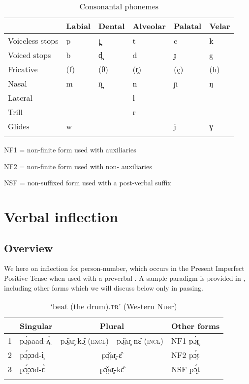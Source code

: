 \documentclass[output=paper,newtxmath,modfonts,nonflat]{langsci/langscibook}
\begin{document}
\begin{table}
\begin{tabularx}{\textwidth}{XXXXXX}
\lsptoprule
& \bfseries Labial & \bfseries Dental & \bfseries Alveolar & \bfseries Palatal & \bfseries Velar\\
\midrule 
Voiceless stops & p & t̪ & t & c & k\\
Voiced stops & b & d̪ & d & ɟ & g\\
Fricative & (f) & (θ) & (r̥) & (ç) & (h)\\
Nasal & m & n̪ & n & ɲ & ŋ\\
Lateral &  &  & l &  & \\
Trill &  &  & r &  & \\
Glides & w &  &  & j & ɣ\\
\lspbottomrule
\end{tabularx}
\caption{Consonantal phonemes}
\label{tab:monich:2}
\end{table}

\pagebreak

NF1 = non-finite form used with  auxiliaries

NF2 = non-finite form used with non- auxiliaries

NSF = non-suffixed form used with a post-verbal suffix

\section{Verbal inflection}
\subsection{Overview} %

We  here on inflection for  person-number, which occurs in the Present Imperfect Positive Tense when used with a preverbal . A sample paradigm is provided in , including other forms which we will discuss below only in passing.

\begin{table}
\begin{tabularx}{\textwidth}{llrll}
\lsptoprule
 & \bfseries Singular & \multicolumn{2}{c}{\bfseries Plural} & \bfseries Other forms\\
\midrule
1  & pɔ̤́aaad-ʌ̤̀ & \multicolumn{1}{r}{pɔ̤̌ar̥-kɔ̤̌ (\textsc{excl})} & \multicolumn{1}{l}{pɔ̤̌ar̥-nɛ̂ (\textsc{incl})} & NF1 pɔ̤̀r̥\\
2 & pɔ̤́ɔɔd-ì̤ & \multicolumn{2}{c}{pɔ̤̌ar̥-ɛ̂} & NF2 pɔ̤́t\\
3 & pɔ̤́ɔɔd-ɛ̀ & \multicolumn{2}{c}{pɔ̤̌ar̥-kɛ̂} & NSF pɔ̤́t\\
\lspbottomrule
\end{tabularx}
\caption{‘beat (the drum)\textsc{.tr}’ (Western Nuer)}
\label{tab:monich:3}
\end{table}
\end{document}

